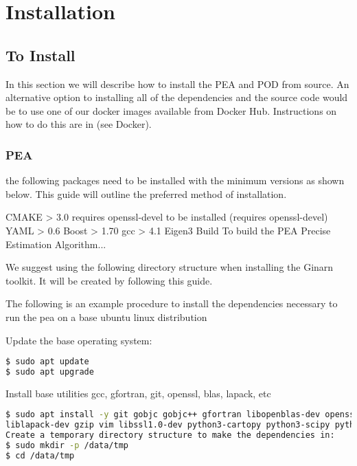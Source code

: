 \chapter{Installation}
\label{ch:installation}


\section{To Install} 

In this section we will describe how to install the PEA and POD from source. An alternative option to installing all of the dependencies and the source code would be to use one of our docker images available from Docker Hub. Instructions on how to do this are in (see Docker).

\subsection{PEA}


 the following packages need to be installed with the minimum versions as shown below. This guide will outline the preferred method of installation.

CMAKE  > 3.0 requires openssl-devel to be installed (requires openssl-devel)
YAML   > 0.6
Boost  > 1.70
gcc    > 4.1
Eigen3
Build
To build the PEA Precise Estimation Algorithm...

We suggest using the following directory structure when installing the Ginarn toolkit. It will be created by following this guide.


The following is an example procedure to install the dependencies necessary to run the pea on a base ubuntu linux distribution

Update the base operating system:

\begin{lstlisting}[language=bash]
$ sudo apt update
$ sudo apt upgrade
\end{lstlisting}

Install base utilities gcc, gfortran, git, openssl, blas, lapack, etc
\begin{lstlisting}[language=bash]
$ sudo apt install -y git gobjc gobjc++ gfortran libopenblas-dev openssl curl net-tools openssh-server cmake make \
liblapack-dev gzip vim libssl1.0-dev python3-cartopy python3-scipy python3-matplotlib python3-mpltoolkits.basemap
Create a temporary directory structure to make the dependencies in:
$ sudo mkdir -p /data/tmp
$ cd /data/tmp
\end{lstlisting}

